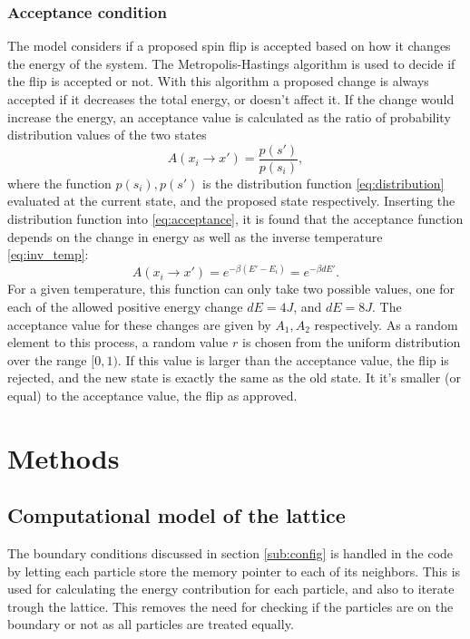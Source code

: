 \documentclass[english,notitlepage,reprint,nofootinbib]{revtex4-1}  %
\begin{document}
\subsubsection*{Acceptance condition}\label{sub:acceptance}
The model considers if a proposed spin flip is accepted based on how it changes the energy of the system. The Metropolis-Hastings algorithm\cite{10.1093/biomet/57.1.97} is used to decide if the flip is accepted or not. With this algorithm
a proposed change is always accepted if it decreases the total energy, or doesn't affect it. If the change would increase the energy, an acceptance value is calculated as the ratio of probability distribution values of the two states
\begin{equation}\label{eq:acceptance}
    A(x_i \to x') = \frac{p(s')}{p(s_i)},
\end{equation}
where the function $p(s_i),p(s')$ is the distribution function \eqref{eq:distribution} evaluated at the current state, and the proposed state respectively. Inserting the distribution function into \eqref{eq:acceptance}, it is found that the acceptance function depends on the change in energy as well as the inverse temperature \eqref{eq:inv_temp}:
\begin{equation}\label{eq:acceptance_dE}
    A(x_i \to x') = e^{-\beta (E' - E_i)} = e^{-\beta dE'}.
\end{equation}
For a given temperature, this function can only take two possible values, one for each of the allowed positive energy change $dE = 4J$, and $dE = 8J$. The acceptance value for these changes are given by $A_1,A_2$ respectively. 
As a random element to this process, a random value $r$ is chosen from the uniform distribution over the range $[0,1)$. If this value is larger than the acceptance value, the flip is rejected, and the new state is exactly the same as the old state. It it's smaller (or equal) to the acceptance value, the flip as approved.


\section{Methods}\label{sec:methods}
%
\subsection{Computational model of the lattice}

The boundary conditions discussed in section \ref{sub:config} is handled in the code by letting each particle store the memory pointer to each of its neighbors. This is used for calculating the energy contribution for each particle, and also to iterate trough the lattice. This removes the need for checking if the particles are on the boundary or not as all particles are treated equally.
\end{document}
